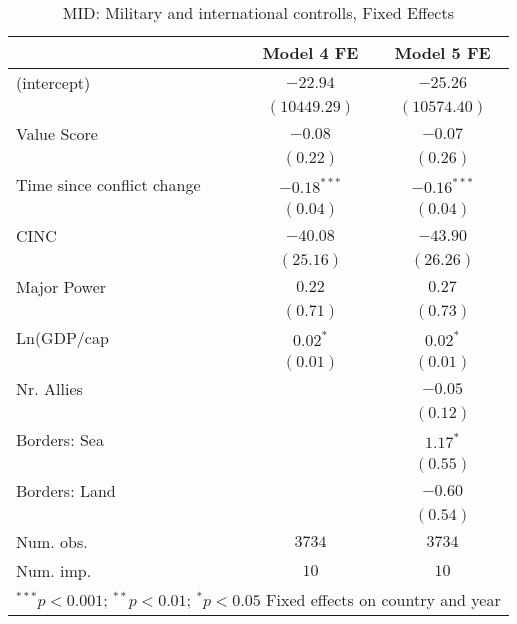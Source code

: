 
\begin{table}
\begin{center}
\begin{tabular}{l c c}
\toprule
 & Model 4 FE & Model 5 FE \\
\midrule
(intercept)                & $-22.94$      & $-25.26$      \\
                           & $(10449.29)$  & $(10574.40)$  \\
Value Score                & $-0.08$       & $-0.07$       \\
                           & $(0.22)$      & $(0.26)$      \\
Time since conflict change & $-0.18^{***}$ & $-0.16^{***}$ \\
                           & $(0.04)$      & $(0.04)$      \\
CINC                       & $-40.08$      & $-43.90$      \\
                           & $(25.16)$     & $(26.26)$     \\
Major Power                & $0.22$        & $0.27$        \\
                           & $(0.71)$      & $(0.73)$      \\
Ln(GDP/cap                 & $0.02^{*}$    & $0.02^{*}$    \\
                           & $(0.01)$      & $(0.01)$      \\
Nr. Allies                 &               & $-0.05$       \\
                           &               & $(0.12)$      \\
Borders: Sea               &               & $1.17^{*}$    \\
                           &               & $(0.55)$      \\
Borders: Land              &               & $-0.60$       \\
                           &               & $(0.54)$      \\
\midrule
Num. obs.                  & $3734$        & $3734$        \\
Num. imp.                  & $10$          & $10$          \\
\bottomrule
\multicolumn{3}{l}{\scriptsize{$^{***}p<0.001$; $^{**}p<0.01$; $^{*}p<0.05$ 
                  Fixed effects on country and year}}
\end{tabular}
\caption{MID: Military and international controlls, Fixed Effects}
\label{MID_2_FE}
\end{center}
\end{table}
